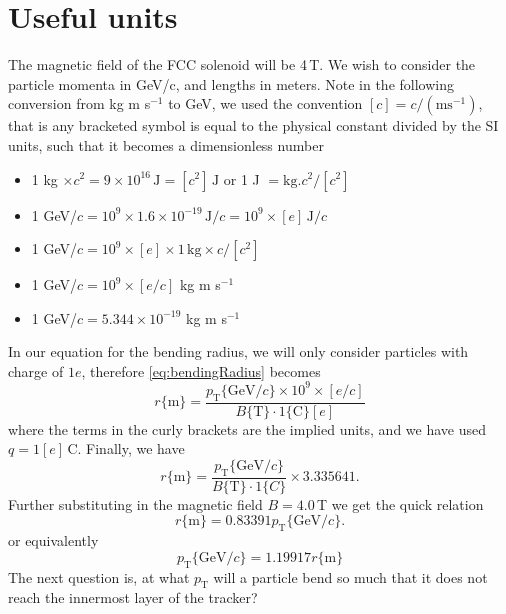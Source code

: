 \documentclass[a4paper, 12pt]{article}
\newcommand{\pt}{\ensuremath{p_{\mathrm{T}}}\xspace}
\begin{document}
\section{Useful units} 
The magnetic field of the FCC solenoid will be 4\,T. 
We wish to consider the particle momenta in GeV/c, and lengths in meters. 
Note in the following conversion from kg m s$^{-1}$ to GeV, we used the convention $[c] = c /(\mathrm{m s}^{-1})$, that is any bracketed symbol is equal to the physical constant divided by the SI
units, such that it becomes a dimensionless number  
\begin{itemize}
  \item 1 kg $\times c^2 = 9 \times 10^{16}\,\mathrm{J} = [c^2]\,\mathrm{J}$ or 1 J $ = \mathrm{kg}.c^2 / [c^2]$
  \item 1 GeV/$c = 10^9 \times 1.6 \times 10^{-19}\,\mathrm{J}/c = 10^9 \times [e] \, \mathrm{J}/c$
  \item 1 GeV/$c = 10^9 \times [e] \times 1 \, \mathrm{kg} \times c / [c^2]$
  \item 1 GeV/$c = 10^9 \times [e/c] $ kg m s$^{-1}$
  \item 1 GeV/$c = 5.344 \times 10^{-19}$ kg m s$^{-1}$
\end{itemize}
In our equation for the bending radius, we will only consider particles with charge of $1e$, therefore
\cref{eq:bendingRadius} becomes
\begin{equation}
  r\{\mathrm{m}\} = \frac{ \pt\{\mathrm{GeV}/c\} \times 10^9 \times [e/c]}{B\{\mathrm{T}\} \cdot 1\{\mathrm{C}\}[e]} 
\end{equation}
where the terms in the curly brackets are the implied units, and we have used $q = 1[e]$\,C. 
Finally, we have
\begin{equation}
  r\{\mathrm{m}\} = \frac{ \pt\{\mathrm{GeV}/c\} }{ B\{\mathrm{T}\} \cdot 1\{C\}} \times 3.335641. 
\end{equation}
Further substituting in the magnetic field $B=4.0$\,T we get the quick relation
\begin{equation}
  \boxed{
    r\{\mathrm{m}\} = 0.83391 \pt \{\mathrm{GeV}/c\}.
}
  \label{eq:bendingRadiusSimp}
\end{equation}
or equivalently
\begin{equation}
  \boxed{
    \pt\{\mathrm{GeV}/c\} = 1.19917 r \{\mathrm{m} \}
  }
\end{equation}
The next question is, at what \pt will a particle bend so much that it does not reach the innermost layer of the tracker?
\end{document}
